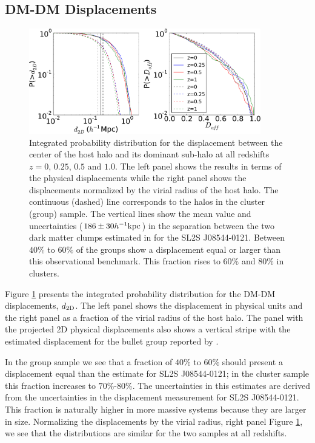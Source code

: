 \documentclass{emulateapj}
\newcommand{\hkpc}{{\ifmmode{h^{-1}{\rm kpc}}\else{$h^{-1}$kpc }\fi}}
\newcommand{\bullg}{SL2S J08544-0121}
\begin{document}
\subsection{DM-DM Displacements}
\label{fig:displacement}

\begin{figure}
\begin{center}
\includegraphics[width=0.9\textwidth]{figure_1.pdf}
\end{center}
\caption{
  Integrated probability distribution for the displacement between the
  center of the host halo and its dominant sub-halo at all redshifts
  $z=0$, $0.25$, $0.5$ and $1.0$. The left panel
  shows the results in terms of the physical displacements while the
  right panel shows the displacements normalized by the virial radius
  of the host halo. The continuous (dashed) line corresponds to the halos in the
  cluster (group) sample.
  The vertical lines show the mean value and uncertainties ($186\pm
  30\hkpc$) in the  separation between the two dark matter clumps
  estimated in \citet{Gastaldello} for the \bullg. Between $40\%$
  to $60\%$ of the groups show a displacement equal or larger than
  this observational benchmark. This fraction rises to $60\%$ and
  $80\%$ in clusters.}
\label{fig:displacement}
\end{figure}

Figure \ref{fig:displacement} presents the integrated
probability distribution for the DM-DM displacements, $d_{\rm 2D}$. The
left panel shows the displacement in physical units and the right
panel as a fraction of the virial radius of the host halo.  The panel
with the projected 2D physical displacements also shows a vertical
stripe with the estimated displacement for the bullet group reported
by \cite{Gastaldello}.   

In the group sample we see that a fraction of
$40\%$ to $60\%$  should present a displacement equal than the
estimate for \bullg; in the cluster sample this fraction increases to
$70\%$-$80\%$. The uncertainties in this estimates are derived from
the uncertainties in the displacement measurement for \bullg. This
fraction is naturally higher in more massive systems because they are
larger in size. Normalizing the displacements by the virial radius,
right panel Figure \ref{fig:displacement}, we see that the
distributions are similar for the two samples at all redshifts.
\end{document}
